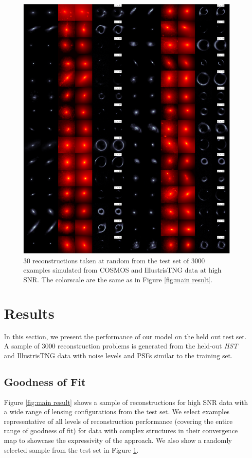 \begin{figure}[H]
        \centering
        \includegraphics[width=\linewidth]{figures/test_set_no_cherry_pick}
        \caption{
                30 reconstructions taken at random from the test set of 3000 examples simulated from COSMOS 
                and IllustrisTNG data at high SNR.
                The colorscale are the same as in Figure \ref{fig:main result}.}
        \label{fig:random sample}
	\vspace{-1.5pt} %
\end{figure}


\section{Results}\label{sec:results}

In this section, we present the performance of our model 
on the held out test set. A sample of 3000 reconstruction 
problems is generated from the held-out \textit{HST} and IllustrisTNG data 
with noise levels and PSFs similar to the training set.

\subsection{Goodness of Fit}
Figure \ref{fig:main result} shows a sample of reconstructions for high SNR data with a wide range of lensing configurations from the test set.
We select examples representative of all levels of reconstruction performance (covering the entire range of goodness of fit) for data with  complex structures in their convergence map to showcase the expressivity of the approach. 
We also show a randomly selected sample from the test set in Figure \ref{fig:random sample}.

